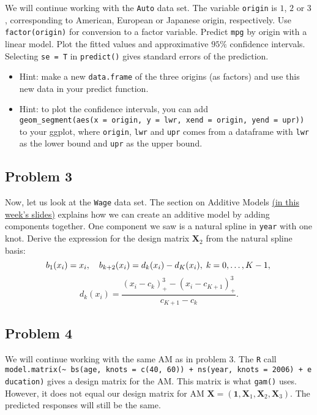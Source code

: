 \documentclass[
]{article}
\begin{document}
We will continue working with the \texttt{Auto} data set. The variable
\texttt{origin} is \(1\), \(2\) or \(3\), corresponding to American,
European or Japanese origin, respectively. Use \texttt{factor(origin)}
for conversion to a factor variable. Predict \texttt{mpg} by origin with
a linear model. Plot the fitted values and approximative \(95\%\)
confidence intervals. Selecting \texttt{se\ =\ T} in \texttt{predict()}
gives standard errors of the prediction.

\begin{itemize}
\item
  Hint: make a new \texttt{data.frame} of the three origins (as factors)
  and use this new data in your predict function.
\item
  Hint: to plot the confidence intervals, you can add
  \texttt{geom\_segment(aes(x\ =\ origin,\ y\ =\ lwr,\ xend\ =\ origin,\ yend\ =\ upr))}
  to your ggplot, where \texttt{origin}, \texttt{lwr} and \texttt{upr}
  comes from a dataframe with \texttt{lwr} as the lower bound and
  \texttt{upr} as the upper bound.
\end{itemize}

\hypertarget{problem-3}{%
\subsection{Problem 3}\label{problem-3}}

Now, let us look at the \texttt{Wage} data set. The section on Additive
Models
\href{https://github.com/stefaniemuff/statlearning2/blob/master/7BeyondLinear/7BeyondLinear_2024.pdf}{(in
this week's slides)} explains how we can create an additive model by
adding components together. One component we saw is a natural spline in
\texttt{year} with one knot. Derive the expression for the design matrix
\(\mathbf X_2\) from the natural spline basis: \[
b_1(x_i) = x_i, \quad b_{k+2}(x_i) = d_k(x_i)-d_K(x_i),\; k = 0, \ldots, K - 1,\\
\] \[
d_k(x_i) = \frac{(x_i-c_k)^3_+-(x_i-c_{K+1})^3_+}{c_{K+1}-c_k}.
\]

\hypertarget{problem-4}{%
\subsection{Problem 4}\label{problem-4}}

We will continue working with the same AM as in problem 3. The
\texttt{R} call
\texttt{model.matrix(\textasciitilde{}\ bs(age,\ knots\ =\ c(40,\ 60))\ +\ ns(year,\ knots\ =\ 2006)\ +\ education)}
gives a design matrix for the AM. This matrix is what \texttt{gam()}
uses. However, it does not equal our design matrix for AM
\(\mathbf X = (\mathbf{1}, \mathbf{X}_1, \mathbf{X}_2, \mathbf{X}_3)\).
The predicted responses will still be the same.
\end{document}
